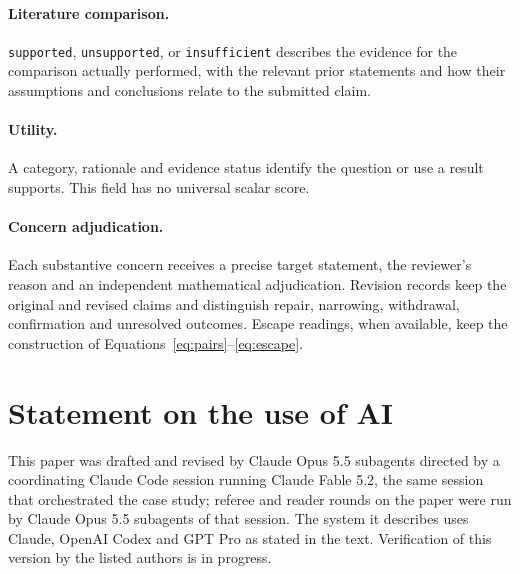 \documentclass[11pt]{article}
\newcommand{\status}[1]{\texttt{#1}}
\begin{document}
\paragraph{Literature comparison.}
\status{supported}, \status{unsupported}, or \status{insufficient} describes
the evidence for the comparison actually performed, with the relevant prior
statements and how their assumptions and conclusions relate to the submitted
claim.

\paragraph{Utility.}
A category, rationale and evidence status identify the question or use a
result supports. This field has no universal scalar score.

\paragraph{Concern adjudication.}
Each substantive concern receives a precise target statement, the reviewer's
reason and an independent mathematical adjudication. Revision records keep
the original and revised claims and distinguish repair, narrowing,
withdrawal, confirmation and unresolved outcomes. Escape readings, when
available, keep the construction of
Equations~\eqref{eq:pairs}--\eqref{eq:escape}.

\section*{Statement on the use of AI}
This paper was drafted and revised by Claude Opus 5.5 subagents directed by a
coordinating Claude Code session running Claude Fable 5.2, the same session
that orchestrated the case study; referee and reader rounds on the paper
were run by Claude Opus 5.5 subagents of that session. The system it
describes uses Claude, OpenAI Codex and GPT Pro as stated in the text.
Verification of this version by the listed authors is in progress.



\end{document}
